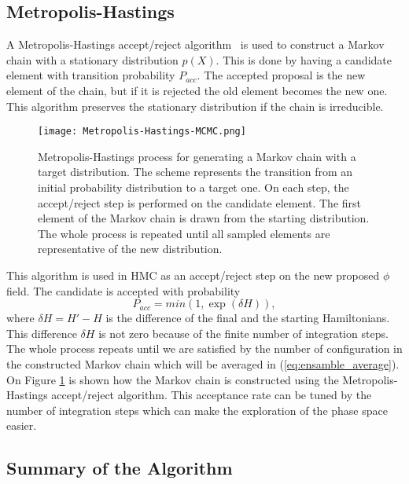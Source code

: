 \subsection{Metropolis-Hastings}

A Metropolis-Hastings accept/reject algorithm~\cite{mhog, mhexpl} is used to construct a Markov chain with a stationary distribution $p(X)$. This is done by having a candidate element with transition probability $P_{acc}$. The accepted proposal is the new element of the chain, but if it is rejected the old element becomes the new one. This algorithm preserves the stationary distribution if the chain is irreducible.

\begin{figure}[htbp]
    \centerline{\texttt{[image: 
        Metropolis-Hastings-MCMC.png]}}
    \caption{Metropolis-Hastings process for generating a Markov chain with a target distribution. The scheme represents the transition from an initial probability distribution to a target one. On each step, the accept/reject step is performed on the candidate element. The first element of the Markov chain is drawn from the starting distribution. The whole process is repeated until all sampled elements are representative of the new distribution. %
    }
    \label{fig:mn-mcmc}
\end{figure}
This algorithm is used in HMC as an accept/reject step on the new proposed $\phi$ field. The candidate is accepted with probability 
\begin{equation}
    P_{acc} = min(1, \exp(\delta H)),
\end{equation}
where $\delta H = H' - H$ is the difference of the final and the starting Hamiltonians. This difference $\delta H$ is not zero because of the finite number of integration steps. The whole process repeats until we are satisfied by the number of configuration in the constructed Markov chain which will be averaged in (\ref{eq:ensamble_average}). On Figure \ref{fig:mn-mcmc} is shown how the Markov chain is constructed using the Metropolis-Hastings accept/reject algorithm. This acceptance rate can be tuned by the number of integration steps which can make the exploration of the phase space easier.

\subsection{Summary of the Algorithm}

